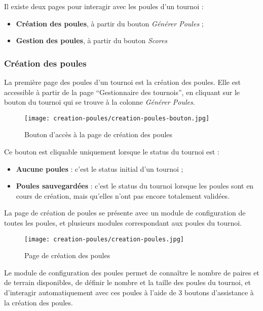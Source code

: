 Il existe deux pages pour interagir avec les poules d'un tournoi :

\begin{itemize}
\item \textbf{Création des poules}, à partir du bouton \textit{Générer Poules} ;
\item \textbf{Gestion des poules}, à partir du bouton \textit{Scores}
\end{itemize}

\subsubsection{Création des poules}

La première page des poules d'un tournoi est la création des poules. Elle est accessible à partir de la page \enquote{Gestionnaire des tournois}, en cliquant sur le bouton du tournoi qui se trouve à la colonne \textit{Générer Poules}.

\begin{figure}[H]
\centering
\texttt{[image: creation-poules/creation-poules-bouton.jpg]}
\caption{Bouton d'accès à la page de création des poules}
\end{figure}

Ce bouton est cliquable uniquement lorsque le status du tournoi est :

\begin{itemize}
\item \textbf{Aucune poules} : c'est le status initial d'un tournoi ;
\item \textbf{Poules sauvegardées} : c'est le status du tournoi lorsque les poules sont en cours de création, mais qu'elles n'ont pas encore totalement validées.
\end{itemize}
\bigskip

La page de création de poules se présente avec un module de configuration de toutes les poules, et plusieurs modules correspondant aux poules du tournoi.

\begin{figure}[H]
\centering
\texttt{[image: creation-poules/creation-poules.jpg]}
\caption{Page de création des poules}
\end{figure}

Le module de configuration des poules permet de connaître le nombre de paires et de terrain disponibles, de définir le nombre et la taille des poules du tournoi, et d'interagir automatiquement avec ces poules à l'aide de 3 boutons d'assistance à la création des poules.

